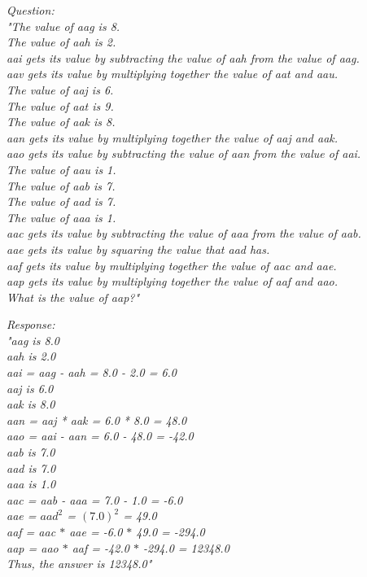 \begin{tcolorbox}[colback=yellow!2!white, colframe=black, boxrule=0.5pt]
\small
\textit{Question: \\ "The value of aag is 8.\\ The value of aah is 2.\\ aai gets its value by subtracting the value of aah from the value of aag.\\ aav gets its value by multiplying together the value of aat and aau.\\ The value of aaj is 6.\\ The value of aat is 9.\\ The value of aak is 8.\\ aan gets its value by multiplying together the value of aaj and aak.\\ aao gets its value by subtracting the value of aan from the value of aai.\\ The value of aau is 1.\\ The value of aab is 7.\\ The value of aad is 7.\\ The value of aaa is 1.\\ aac gets its value by subtracting the value of aaa from the value of aab.\\ aae gets its value by squaring the value that aad has.\\ aaf gets its value by multiplying together the value of aac and aae.\\ aap gets its value by multiplying together the value of aaf and aao.\\ What is the value of aap?"}
\end{tcolorbox}

\begin{tcolorbox}[colback=yellow!2!white, colframe=black, boxrule=0.5pt]
\small
\textit{Response: \\ "aag is 8.0\\ aah is 2.0\\ aai = aag - aah = 8.0 - 2.0 = 6.0\\ aaj is 6.0\\ aak is 8.0\\ aan = aaj * aak = 6.0 * 8.0 = 48.0\\ aao = aai - aan = 6.0 - 48.0 = -42.0\\ aab is 7.0\\ aad is 7.0\\ aaa is 1.0\\ aac = aab - aaa = 7.0 - 1.0 = -6.0\\ aae = $aad^2$ = $(7.0)^2$ = 49.0\\ aaf = aac $*$ aae = -6.0 $*$ 49.0 = -294.0\\ aap = aao $*$ aaf = -42.0 $*$ -294.0 = 12348.0\\ Thus, the answer is 12348.0"}
\end{tcolorbox}


